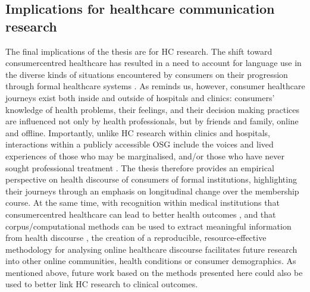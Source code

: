 \subsection{Implications for healthcare communication research}

The final implications of the thesis are for \gls{HC} research. The shift toward \gls{consumercentred} healthcare has resulted in a need to account for language use in the diverse kinds of situations encountered by consumers on their progression through formal healthcare systems \cite{matthiessen_applying_2013,slade_emergency_2008}. As \textcite{jones_health_2013} reminds us, however, consumer healthcare journeys exist both inside and outside of hospitals and clinics: consumers' knowledge of health problems, their feelings, and their decision making practices are influenced not only by health professionals, but by friends and family, online and offline. Importantly, unlike \gls{HC} research within clinics and hospitals, interactions within a publicly accessible \gls{OSG} include the voices and lived experiences of those who may be marginalised, and\slash or those who have never sought professional treatment \cite{harvey_disclosures_2012,mautner_time_2005}. The thesis therefore provides an empirical perspective on health discourse of consumers of formal institutions, highlighting their journeys through an emphasis on longitudinal change over the membership course. At the same time, with recognition within medical institutions that \gls{consumercentred} healthcare can lead to better health outcomes \cite{woodward-kron_international_2016}, and that corpus\slash computational methods can be used to extract meaningful information from health discourse \cite{mayfield_automating_2014}, the creation of a reproducible, resource\hyp{}effective methodology for analysing online healthcare discourse facilitates future research into other online communities, health conditions or consumer demographics. As mentioned above, future work based on the methods presented here could also be used to better link \gls{HC} research to clinical outcomes.


